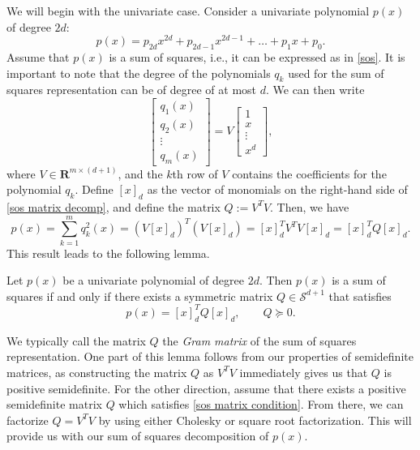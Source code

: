 	We will begin with the univariate case. Consider a univariate polynomial $p(x)$ of degree $2d$:
	\begin{equation}
		p(x) = p_{2d}x^{2d} + p_{2d-1}x^{2d-1} + \dots + p_1 x + p_0.
	\end{equation}
	Assume that $p(x)$ is a sum of squares, i.e., it can be expressed as in \eqref{sos}. It is important to note that the degree of the polynomials $q_k$ used for the sum of squares representation can be of degree of at most $d$. We can then write
	\begin{equation} \label{sos matrix decomp}
		\begin{bmatrix}
		q_1 (x) \\ q_2 (x) \\ \vdots \\ q_m (x)
		\end{bmatrix}
		=
		V \begin{bmatrix}
		1 \\ x \\ \vdots \\ x^d
		\end{bmatrix},
	\end{equation}
	where $V \in \mathbf{R}^{m \times (d+1)}$, and the $k$th row of $V$ contains the coefficients for the polynomial $q_k$. Define $[x]_d$ as the vector of monomials on the right-hand side of \eqref{sos matrix decomp}, and define the matrix $Q := V^T V$. Then, we have
	$$
	p(x) = \sum_{k=1}^{m} q_k^2 (x) = (V[x]_d)^T (V[x]_d) = [x]_d^T V^T V [x]_d = [x]_d^T Q [x]_d.
	$$
	This result leads to the following lemma.
	\begin{lemma}
		Let $p(x)$ be a univariate polynomial of degree $2d$. Then $p(x)$ is a sum of squares if and only if there exists a symmetric matrix $Q \in \mathcal{S}^{d+1}$ that satisfies
		\begin{equation} \label{sos matrix condition}
		p(x) = [x]_d^T Q [x]_d, \qquad Q \succeq 0.
		\end{equation}
	\end{lemma}
	
	We typically call the matrix $Q$ the \emph{Gram matrix} of the sum of squares representation. One part of this lemma follows from our properties of semidefinite matrices, as constructing the matrix $Q$ as $V^T V$ immediately gives us that $Q$ is positive semidefinite. For the other direction, assume that there exists a positive semidefinite matrix $Q$ which satisfies \eqref{sos matrix condition}. From there, we can factorize $Q = V^T V$ by using either Cholesky or square root factorization. This will provide us with our sum of squares decomposition of $p(x)$. 
	
